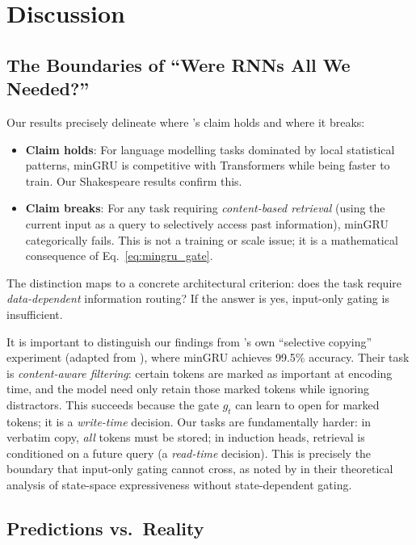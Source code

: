 \documentclass[10pt,a4paper]{article}
\begin{document}
\section{Discussion}

\subsection{The Boundaries of ``Were RNNs All We Needed?''}

Our results precisely delineate where \citeauthor{feng2024were}'s claim holds and where it breaks:

\begin{itemize}
    \item \textbf{Claim holds}: For language modelling tasks dominated by local statistical patterns, minGRU is competitive with Transformers while being faster to train. Our Shakespeare results confirm this.
    \item \textbf{Claim breaks}: For any task requiring \emph{content-based retrieval} (using the current input as a query to selectively access past information), minGRU categorically fails. This is not a training or scale issue; it is a mathematical consequence of Eq.~\ref{eq:mingru_gate}.
\end{itemize}

The distinction maps to a concrete architectural criterion: does the task require \emph{data-dependent} information routing? If the answer is yes, input-only gating is insufficient.

It is important to distinguish our findings from \citeauthor{feng2024were}'s own ``selective copying'' experiment (adapted from \citealt{gu2023mamba}), where minGRU achieves 99.5\% accuracy. Their task is \emph{content-aware filtering}: certain tokens are marked as important at encoding time, and the model need only retain those marked tokens while ignoring distractors. This succeeds because the gate $g_t$ can learn to open for marked tokens; it is a \emph{write-time} decision. Our tasks are fundamentally harder: in verbatim copy, \emph{all} tokens must be stored; in induction heads, retrieval is conditioned on a future query (a \emph{read-time} decision). This is precisely the boundary that input-only gating cannot cross, as noted by \citet{merrill2024illusion} in their theoretical analysis of state-space expressiveness without state-dependent gating.

\subsection{Predictions vs.\ Reality}
\end{document}
